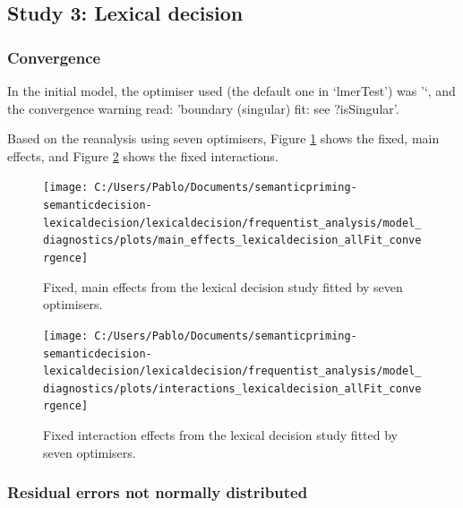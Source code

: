 \documentclass[
  12pt,
  man,floatsintext]{apa7}
\begin{document}
\hypertarget{study-3-lexical-decision-1}{%
\subsection{Study 3: Lexical decision}\label{study-3-lexical-decision-1}}

\hypertarget{convergence-5}{%
\subsubsection{Convergence}\label{convergence-5}}

In the initial model, the optimiser used (the default one in `lmerTest') was '`, and the convergence warning read: 'boundary (singular) fit: see ?isSingular'.

Based on the reanalysis using seven optimisers, Figure \ref{fig:main-effects-lexicaldecision-allFit-convergence} shows the fixed, main effects, and Figure \ref{fig:interactions-lexicaldecision-allFit-convergence} shows the fixed interactions.

\begin{figure}

{\centering \texttt{[image: C:/Users/Pablo/Documents/semanticpriming-semanticdecision-lexicaldecision/lexicaldecision/frequentist\_analysis/model\_diagnostics/plots/main\_effects\_lexicaldecision\_allFit\_convergence]} 

}

\caption{Fixed, main effects from the lexical decision study fitted by seven optimisers.}\label{fig:main-effects-lexicaldecision-allFit-convergence}
\end{figure}

\begin{figure}

{\centering \texttt{[image: C:/Users/Pablo/Documents/semanticpriming-semanticdecision-lexicaldecision/lexicaldecision/frequentist\_analysis/model\_diagnostics/plots/interactions\_lexicaldecision\_allFit\_convergence]} 

}

\caption{Fixed interaction effects from the lexical decision study fitted by seven optimisers.}\label{fig:interactions-lexicaldecision-allFit-convergence}
\end{figure}

\hypertarget{residual-errors-not-normally-distributed-4}{%
\subsubsection{Residual errors not normally distributed}\label{residual-errors-not-normally-distributed-4}}
\end{document}
